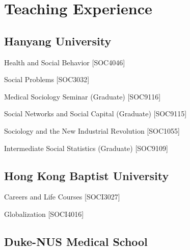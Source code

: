 \section{Teaching Experience}

\subsection{Hanyang University}

\begin{aka}[noitemsep]

    \item [2025--2026] Health and Social Behavior [SOC4046]
    \item Social Problems [SOC3032]
    \item Medical Sociology Seminar (Graduate) [SOC9116]
    \item Social Networks and Social Capital (Graduate) [SOC9115]
\vspace{1em}
    \item [2024] Sociology and the New Industrial Revolution [SOC1055]
    \item  Intermediate Social Statistics (Graduate) [SOC9109]

\end{aka}

\subsection{Hong Kong Baptist University}

\begin{aka}[noitemsep]

    \item [2023--2024] Careers and Life Courses [SOCI3027]
    \item  Globalization [SOCI4016]

\end{aka}

\subsection{Duke-NUS Medical School}

